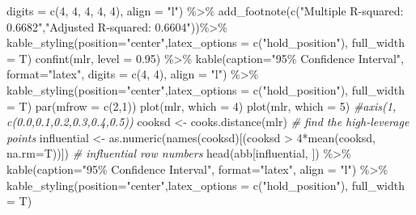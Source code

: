 \documentclass[
]{article}
\newenvironment{Shaded}{\begin{snugshade}}{\end{snugshade}}
\newcommand{\AttributeTok}[1]{\textcolor[rgb]{0.77,0.63,0.00}{#1}}
\newcommand{\CommentTok}[1]{\textcolor[rgb]{0.56,0.35,0.01}{\textit{#1}}}
\newcommand{\DecValTok}[1]{\textcolor[rgb]{0.00,0.00,0.81}{#1}}
\newcommand{\FloatTok}[1]{\textcolor[rgb]{0.00,0.00,0.81}{#1}}
\newcommand{\FunctionTok}[1]{\textcolor[rgb]{0.00,0.00,0.00}{#1}}
\newcommand{\NormalTok}[1]{#1}
\newcommand{\OtherTok}[1]{\textcolor[rgb]{0.56,0.35,0.01}{#1}}
\newcommand{\SpecialCharTok}[1]{\textcolor[rgb]{0.00,0.00,0.00}{#1}}
\newcommand{\StringTok}[1]{\textcolor[rgb]{0.31,0.60,0.02}{#1}}
\begin{document}
\begin{Shaded}
\begin{Highlighting}[]
        \AttributeTok{digits =} \FunctionTok{c}\NormalTok{(}\DecValTok{4}\NormalTok{, }\DecValTok{4}\NormalTok{, }\DecValTok{4}\NormalTok{, }\DecValTok{4}\NormalTok{, }\DecValTok{4}\NormalTok{),}
        \AttributeTok{align =} \StringTok{"l"}\NormalTok{) }\SpecialCharTok{\%\textgreater{}\%} 
  \FunctionTok{add\_footnote}\NormalTok{(}\FunctionTok{c}\NormalTok{(}\StringTok{"Multiple R{-}squared: 0.6682"}\NormalTok{,}\StringTok{"Adjusted R{-}squared: 0.6604"}\NormalTok{))}\SpecialCharTok{\%\textgreater{}\%} 
  \FunctionTok{kable\_styling}\NormalTok{(}\AttributeTok{position=}\StringTok{"center"}\NormalTok{,}\AttributeTok{latex\_options =} \FunctionTok{c}\NormalTok{(}\StringTok{"hold\_position"}\NormalTok{), }\AttributeTok{full\_width =}\NormalTok{ T)}
\FunctionTok{confint}\NormalTok{(mlr, }\AttributeTok{level =} \FloatTok{0.95}\NormalTok{) }\SpecialCharTok{\%\textgreater{}\%}  
  \FunctionTok{kable}\NormalTok{(}\AttributeTok{caption=}\StringTok{"95\% Confidence Interval"}\NormalTok{,}
         \AttributeTok{format=}\StringTok{"latex"}\NormalTok{,}
         \AttributeTok{digits =} \FunctionTok{c}\NormalTok{(}\DecValTok{4}\NormalTok{, }\DecValTok{4}\NormalTok{),}
         \AttributeTok{align =} \StringTok{"l"}\NormalTok{) }\SpecialCharTok{\%\textgreater{}\%}
  \FunctionTok{kable\_styling}\NormalTok{(}\AttributeTok{position=}\StringTok{"center"}\NormalTok{,}\AttributeTok{latex\_options =} \FunctionTok{c}\NormalTok{(}\StringTok{"hold\_position"}\NormalTok{), }\AttributeTok{full\_width =}\NormalTok{ T)}
\FunctionTok{par}\NormalTok{(}\AttributeTok{mfrow =} \FunctionTok{c}\NormalTok{(}\DecValTok{2}\NormalTok{,}\DecValTok{1}\NormalTok{))}
\FunctionTok{plot}\NormalTok{(mlr, }\AttributeTok{which =} \DecValTok{4}\NormalTok{)}
\FunctionTok{plot}\NormalTok{(mlr, }\AttributeTok{which =} \DecValTok{5}\NormalTok{)}
\CommentTok{\#axis(1, c(0.0,0.1,0.2,0.3,0.4,0.5))}
\NormalTok{cooksd }\OtherTok{\textless{}{-}} \FunctionTok{cooks.distance}\NormalTok{(mlr)}
\CommentTok{\# find the high{-}leverage points}
\NormalTok{influential }\OtherTok{\textless{}{-}} \FunctionTok{as.numeric}\NormalTok{(}\FunctionTok{names}\NormalTok{(cooksd)[(cooksd }\SpecialCharTok{\textgreater{}} \DecValTok{4}\SpecialCharTok{*}\FunctionTok{mean}\NormalTok{(cooksd, }\AttributeTok{na.rm=}\NormalTok{T))])  }\CommentTok{\# influential row numbers}
\FunctionTok{head}\NormalTok{(abb[influential, ]) }\SpecialCharTok{\%\textgreater{}\%}  
  \FunctionTok{kable}\NormalTok{(}\AttributeTok{caption=}\StringTok{"95\% Confidence Interval"}\NormalTok{,}
         \AttributeTok{format=}\StringTok{"latex"}\NormalTok{,}
         \AttributeTok{align =} \StringTok{"l"}\NormalTok{) }\SpecialCharTok{\%\textgreater{}\%}
  \FunctionTok{kable\_styling}\NormalTok{(}\AttributeTok{position=}\StringTok{"center"}\NormalTok{,}\AttributeTok{latex\_options =} \FunctionTok{c}\NormalTok{(}\StringTok{"hold\_position"}\NormalTok{), }\AttributeTok{full\_width =}\NormalTok{ T)}


\end{Highlighting}
\end{Shaded}
\end{document}
